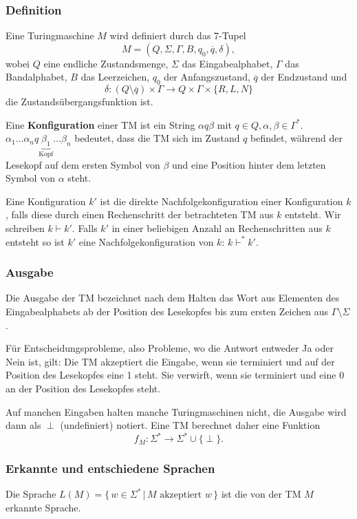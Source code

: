 \documentclass[a4paper,parskip=half*,DIV=7,fontsize=11pt]{scrartcl}
\begin{document}
\subsubsection{Definition}
Eine Turingmaschine $M$ wird definiert durch das 7-Tupel $$M= (Q, \Sigma,\Gamma, B, q_0, \overline{q}, \delta),$$ wobei $Q$ eine endliche Zustandsmenge, $\Sigma$ das Eingabealphabet, $\Gamma$ das Bandalphabet, $B$ das Leerzeichen, $q_0$ der Anfangszustand, $\overline{q}$ der Endzustand und \[\delta : (Q \setminus \overline{q}) \times \Gamma \to Q \times \Gamma \times \{R,L,N\}\]
die Zustandsübergangsfunktion ist.

Eine \textbf{Konfiguration} einer TM ist ein String $\alpha q\beta$ mit $q \in Q, \alpha,\beta \in \Gamma^* $. $\alpha_1\ldots \alpha_n q \underbrace{\beta_1}_{\text{Kopf}}\ldots \beta_n$ bedeutet, dass die TM sich im Zustand $q$ befindet, während der Lesekopf auf dem ersten Symbol von $\beta$ und eine Position hinter dem letzten Symbol von $\alpha$ steht.

Eine Konfiguration $k'$ ist die direkte Nachfolgekonfiguration einer Konfiguration $k$, falls  diese durch einen Rechenschritt der betrachteten TM aus $k$ entsteht. Wir schreiben $k \vdash k'$.  Falls $k'$ in einer beliebigen Anzahl an  Rechenschritten aus $k$ entsteht so ist $k'$ eine Nachfolgekonfiguration von $k$: $k \vdash^* k'$.

\subsubsection{Ausgabe}
Die Ausgabe der TM bezeichnet nach dem Halten das Wort aus Elementen des Eingabealphabets ab der Position des Lesekopfes bis zum ersten Zeichen aus $\Gamma \setminus \Sigma$. 

Für Entscheidungsprobleme, also Probleme, wo die Antwort entweder Ja oder Nein ist, gilt:
Die TM akzeptiert die Eingabe, wenn sie terminiert und auf der Position des Lesekopfes eine 1 steht. Sie verwirft, wenn sie terminiert und eine 0 an der Position des Lesekopfes steht.

Auf manchen Eingaben halten manche Turingmaschinen nicht, die Ausgabe wird dann als $\perp$ (undefiniert) notiert. Eine TM berechnet daher eine Funktion $$f_M : \Sigma^* \to \Sigma^* \cup \{ \perp\}.$$

\subsubsection{Erkannte und entschiedene Sprachen}
Die Sprache $L(M) = \{\, w \in \Sigma^\ast \,\vert\, M \text{ akzeptiert } w\,\}$ ist die von der TM $M$ erkannte Sprache.
\end{document}
